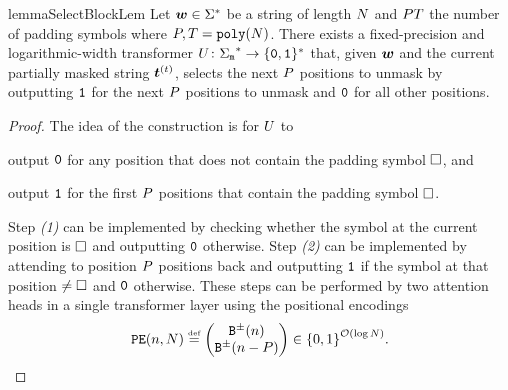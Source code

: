 \begin{restatable}{lemma}{SelectBlockLem} \label{lem:select-block}
   Let ${{\boldsymbol{w}}} \in {{{{{{\Sigma}}^{*}}}}}$ be a string of length ${{N}}$ and ${P} {T}$ the number of padding symbols where $\padlen, \timesteps = \polyFun{\strlen}$.
   There exists a fixed-precision and logarithmic-width transformer ${U} \colon {{{{{\Sigma}}_{{\texttt{m}}}}^{*}}} \to {{\{{\texttt{0}}, {\texttt{1}}\}^{*}}}$ that, given ${{\boldsymbol{w}}}$ and the current partially masked string ${\boldsymbol{t}}^{(t)}$, selects the next ${P}$ positions to unmask by outputting ${\texttt{1}}$ for the next ${P}$ positions to unmask and ${\texttt{0}}$ for all other positions.
\end{restatable}
\begin{proof}
   The idea of the construction is for ${U}$ to 
   \begin{enumerate*}[label=\textit{(\arabic*)}]
      \item output ${\texttt{0}}$ for any position that does not contain the padding symbol ${\square}$, and
      \item output ${\texttt{1}}$ for the first ${P}$ positions that contain the padding symbol ${\square}$.
   \end{enumerate*}
   Step \textit{(1)} can be implemented by checking whether the symbol at the current position is ${\square}$ and outputting ${\texttt{0}}$ otherwise.
   Step \textit{(2)} can be implemented by attending to position ${P}$ positions back and outputting ${\texttt{1}}$ if the symbol at that position $\neq {\square}$ and ${\texttt{0}}$ otherwise.
   These steps can be performed by two attention heads in a single transformer layer using the positional encodings
   \begin{equation} \label{eq:pos-enc-select-block}
      \posEncFun{\stridx, \strlen} \defeq 
      \begin{pmatrix}
         \sbinFun{\stridx} \\
         \sbinFun{\stridx - \padlen} \\
      \end{pmatrix} \in \set{0, 1}^{\bigOFun{\log\strlen}}.
   \end{equation}
\end{proof}

